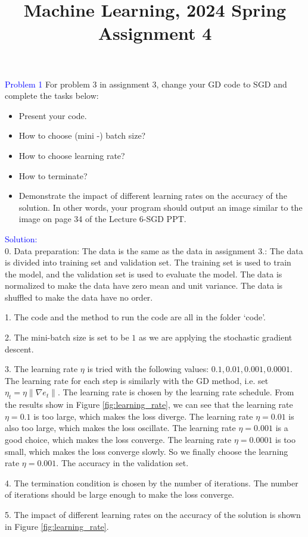 \documentclass{article}
\title{Machine Learning, 2024 Spring\\Assignment 4}
\begin{document}
\maketitle

\begin{abstract}

\end{abstract}

\textcolor{blue}{Problem 1}
For problem 3 in assignment 3, change your GD code to SGD and complete the tasks below:
\begin{itemize}
	\item Present your code.
    \item How to choose (mini -) batch size?
    \item How to choose learning rate?
    \item How to terminate?
    \item Demonstrate the impact of different learning rates on the accuracy of the solution. In other words, your program should  output an image similar to the image on page 34 of the Lecture 6-SGD PPT.
\end{itemize}

\textcolor{blue}{Solution:}\\
0. Data preparation: The data is the same as the data in assignment 3.:
The data is divided into training set and validation set. The training set is used to train the model, and the validation set is used to evaluate the model. The data is normalized to make the data have zero mean and unit variance. The data is shuffled to make the data have no order.

1. The code and the method to run the code are all in the folder `code'.

2. The mini-batch size is set to be $1$ as we are applying the stochastic gradient descent.

3. The learning rate $\eta$ is tried with the following values: $0.1, 0.01, 0.001, 0.0001$. The learning rate for each step is similarly with the GD method, i.e. set $\eta_t = \eta\|\nabla e_t\|$. The learning rate is chosen by the learning rate schedule. 
From the results show in Figure \ref{fig:learning_rate}, we can see that the learning rate $\eta = 0.1$ is too large, which makes the loss diverge. The learning rate $\eta = 0.01$ is also too large, which makes the loss oscillate.
The learning rate $\eta = 0.001$ is a good choice, which makes the loss converge. The learning rate $\eta = 0.0001$ is too small, which makes the loss converge slowly.
So we finally choose the learning rate $\eta = 0.001$.
The accuracy in the validation set.



4. The termination condition is chosen by the number of iterations. The number of iterations should be large enough to make the loss converge.

5. The impact of different learning rates on the accuracy of the solution is shown in Figure \ref{fig:learning_rate}.

\end{document}
